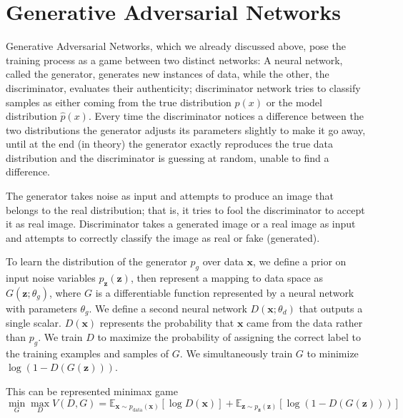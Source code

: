 \section{Generative Adversarial Networks} %
\label{sec:generative_adversarial_networks}
Generative Adversarial Networks, which we already discussed above, pose the training process as a game between two distinct networks: A neural network, called the generator, generates new instances of data, while the other, the discriminator, evaluates their authenticity; discriminator network tries to classify samples as either coming from the true distribution $p(x)$ or the model distribution $\hat{p}(x)$. Every time the discriminator notices a difference between the two distributions the generator adjusts its parameters slightly to make it go away, until at the end (in theory) the generator exactly reproduces the true data distribution and the discriminator is guessing at random, unable to find a difference.\par\bigskip
The generator takes noise as input and attempts to produce an image that belongs to the real distribution; that is, it tries to fool the discriminator to accept it as real image. Discriminator takes a generated image or a real image as input and attempts to correctly classify the image as real or fake (generated).\par\bigskip
To learn the distribution of the generator $p_g$ over data $\bm{x}$, we define a prior on input noise variables $p_{\bm{z}}(\bm{z})$, then represent a mapping to data space as $G(\bm{z}; \theta_g)$, where $G$ is a differentiable function represented by a neural network with parameters $\theta_g$. We define a second neural network $D(\bm{x}; \theta_d)$ that outputs a single scalar. $D(\bm{x})$ represents the probability that $\bm{x}$ came from the data rather than $p_g$. We train $D$ to maximize the probability of assigning the correct label to the training examples and samples of $G$. We simultaneously train $G$ to minimize $\log(1-D(G(\bm{z})))$.\par\bigskip
\noindent This can be represented minimax game \\
\begin{equation} \label{eu_eqn}
\min_{G} \max_{D} V(D, G)=\mathbb{E}_{\bm{x} \sim p_{\text{data}}(\bm{x})}[\log D(\bm{x})]+\mathbb{E}_{\bm{z} \sim p_{\bm{z}}(\bm{z})}[\log (1 - D(G(\bm{z})))]
\end{equation}

